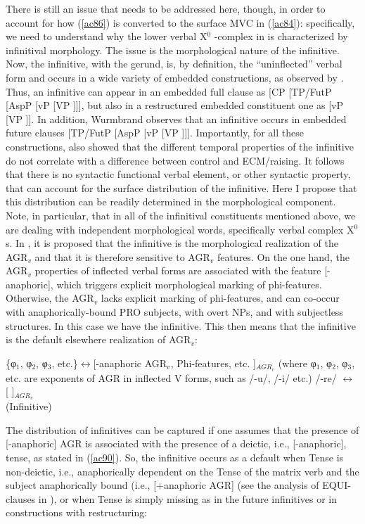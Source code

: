 \documentclass[output=paper]{langscibook}
\begin{document}
There is still an issue that needs to be addressed here, though, in order to account for how (\ref{ac86}) is converted to the surface MVC in (\ref{ac84}): specifically, we need to understand why the lower verbal X$^0$ -complex in  is characterized by infinitival morphology. The issue is the morphological nature of the infinitive. Now, the infinitive, with the gerund, is, by definition, the “uninflected” verbal form and occurs in a wide variety of embedded constructions, as observed by \cite{wurmbrand2014a}.  Thus, an infinitive can appear in an embedded full clause as [CP [TP/FutP [AspP [vP [VP ]]], but also in a restructured embedded constituent one as [vP [VP ]].  In addition, Wurmbrand observes that an infinitive occurs in embedded future clauses  [TP/FutP [AspP [vP [VP ]]]. Importantly, for all these constructions, \cite{wurmbrand2014a} also showed that the different temporal properties of the infinitive do not correlate with a difference between control and ECM/raising. It follows that there is no syntactic functional verbal element, or other syntactic property, that can account for the surface distribution of the infinitive. Here I propose that this distribution can be readily determined in the morphological component. Note, in particular, that in all of the infinitival constituents mentioned above, we are dealing with independent morphological words, specifically verbal complex X$^0$s. In \cite{calabrese1993a}, it is proposed that the infinitive is the morphological realization of the  AGR$_v$ and that it is therefore sensitive to  AGR$_v$ features. On the one hand, the  AGR$_v$ properties of inflected verbal forms are associated with the feature [-anaphoric], which triggers explicit morphological marking of phi-features.  Otherwise, the  AGR$_v$ lacks explicit marking of phi-features, and can co-occur with anaphorically-bound PRO subjects, with overt NPs, and with subjectless structures. In this case we have the infinitive. This then means that the infinitive is the default elsewhere realization of AGR$_v$:

\ea\label{ac89}
    \ea \label{ac89a}\{φ$_1$, φ$_2$, φ$_3$, etc.\}$\longleftrightarrow$[-anaphoric  AGR$_v$, Phi-features, etc. ]$_{AGR_v}$
       (where φ$_1$, φ$_2$, φ$_3$, etc. are exponents of AGR in inflected V forms, such as /-u/, /-i/ etc.)
    \ex \label{ac89b}/-re/ $\longleftrightarrow$  [   ]$_{AGR_v}$\\
     (Infinitive)
    \z
\z

The distribution of infinitives can be captured if one assumes that the presence of [-anaphoric] AGR is associated with the presence of a deictic, i.e., [-anaphoric], tense, as stated in (\ref{ac90}). So, the infinitive occurs as a default when Tense is non-deictic, i.e., anaphorically dependent on the Tense of the matrix verb and the subject anaphorically bound (i.e., [+anaphoric AGR] (see the analysis of EQUI-clauses in \cite{calabrese1993a}), or when Tense is simply missing as in the future infinitives or in constructions with restructuring:
\end{document}
